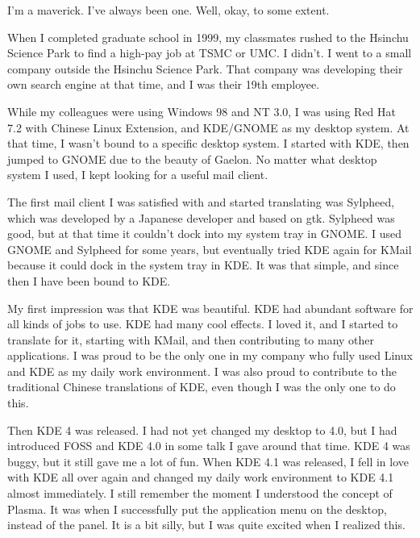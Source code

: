 


\noindent{}I'm a maverick. I've always been one. Well, okay, to some extent.

When I completed graduate school in 1999, my classmates
rushed to the Hsinchu Science Park to find a high-pay job at TSMC
or UMC. I didn't. I went to a small company outside the Hsinchu Science
Park. That company was developing their own search engine at that time,
and I was their 19th employee.

While my colleagues were using Windows 98 and NT 3.0, I was using Red Hat
7.2 with Chinese Linux Extension, and KDE/GNOME as my desktop system.
At that time, I wasn't bound to a specific desktop system. I started
with KDE, then jumped to GNOME due to the beauty of Gaelon. No matter what 
desktop system I used, I kept looking for a useful mail client.

The first mail client I was satisfied with and started translating was
Sylpheed, which was developed by a Japanese developer and based on
gtk. Sylpheed was good, but at that time it couldn't dock into my system
tray in GNOME. I used GNOME and Sylpheed for some years, but eventually 
tried KDE again for KMail because it could dock in the system tray in KDE. 
It was that simple, and since then I have been bound to KDE.

My first impression was that KDE was beautiful. KDE had abundant software for all kinds of jobs
to use. KDE had many cool effects. I loved it, and I started to translate
for it, starting with KMail, and then contributing to many other applications. I was proud to
be the only one in my company who fully used Linux and KDE as my daily
work environment. I was also proud to contribute to the traditional
Chinese translations of KDE, even though I was the only one to do
this.

Then KDE 4 was released. I had not yet changed my desktop to 4.0,
but I had introduced FOSS and KDE 4.0 in some talk I gave around that time. KDE 4
was buggy, but it still gave me a lot of fun. When KDE 4.1 was released, I
fell in love with KDE all over again and changed my daily work environment to
KDE 4.1 almost immediately. I still remember the moment I understood
the concept of Plasma. It was when I successfully put the application
menu on the desktop, instead of the panel. It is a bit silly,
but I was quite excited when I realized this.

